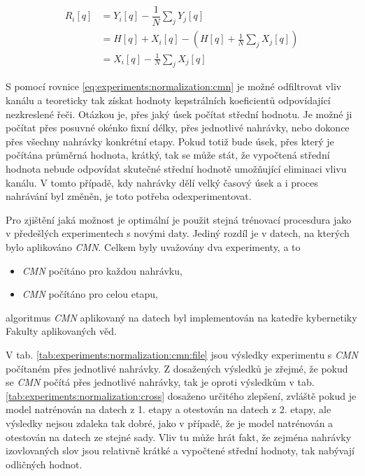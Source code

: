 \begin{align}
  R_i\left[q\right] &= Y_i\left[q\right] - \dfrac{1}{N}\sum_{j} Y_j\left[q\right] \nonumber  \\
  &= H\left[q\right] + X_i\left[q\right] - \left( H\left[q\right] + \frac{1}{N} \sum_j X_j\left[q\right] \right) \nonumber  \\
  &= X_i\left[q\right] - \frac{1}{N} \sum_j X_j\left[q\right]
  \label{eq:experiments:normalization:cmn}
\end{align}

\noindent S pomocí rovnice \ref{eq:experiments:normalization:cmn} je možné odfiltrovat vliv kanálu a teoreticky tak získat hodnoty kepstrálních koeficientů odpovídající nezkreslené řeči. Otázkou je, přes jaký úsek počítat střední hodnotu. Je možné ji počítat přes posuvné okénko fixní délky, přes jednotlivé nahrávky, nebo dokonce přes všechny nahrávky konkrétní etapy. Pokud totiž bude úsek, přes který je počítána průměrná hodnota, krátký, tak se může stát, že vypočtená střední hodnota nebude odpovídat skutečné střední hodnotě umožňující eliminaci vlivu kanálu. V tomto případě, kdy nahrávky dělí velký časový úsek a i proces nahrávání byl změněn, je toto potřeba odexperimentovat.

Pro zjištění jaká možnost je optimální je použit stejná trénovací procesdura jako v předešlých experimentech s novými daty. Jediný rozdíl je v datech, na kterých bylo aplikováno \textit{CMN}.  Celkem byly uvažovány dva experimenty, a to

\begin{itemize}
  \item \textit{CMN}  počítáno pro každou nahrávku,
  \item \textit{CMN}  počítáno pro celou etapu,
\end{itemize}

\noindent algoritmus \textit{CMN}  aplikovaný na datech byl implementován na katedře kybernetiky Fakulty aplikovaných věd.

V tab. \ref{tab:experiments:normalization:cmn:file} jsou výsledky experimentu s \textit{CMN}  počítaném přes jednotlivé nahrávky. Z dosažených výsledků je zřejmé, že pokud se \textit{CMN}  počítá přes jednotlivé nahrávky, tak je oproti výsledkům v tab. \ref{tab:experiments:normalization:cross} dosaženo určitého zlepšení, zvláště pokud je model natrénován na datech z 1. etapy a otestován na datech z 2. etapy, ale výsledky nejsou zdaleka tak dobré, jako v případě, že je model natrénován a otestován na datech ze stejné sady. Vliv tu může hrát fakt, že zejména nahrávky izovlovaných slov jsou relativně krátké a vypočtené střední hodnoty, tak nabývají odličných hodnot.

